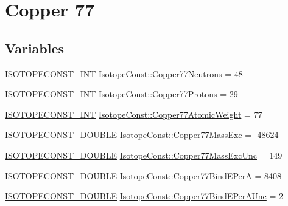 \hypertarget{group___isotope_const-_copper-_cu77}{}\section{Copper 77}
\label{group___isotope_const-_copper-_cu77}
\subsection*{Variables}
\begin{DoxyCompactItemize}
\item 
\mbox{\hyperlink{group___isotope_const-_macros_ga5f18360b3e99483a35c32d789e62621c}{I\+S\+O\+T\+O\+P\+E\+C\+O\+N\+S\+T\+\_\+\+I\+NT}} \mbox{\hyperlink{group___isotope_const-_copper-_cu77_gaa6d8b9e214c55946e8f69bb8a0518c28}{Isotope\+Const\+::\+Copper77\+Neutrons}} = 48
\item 
\mbox{\hyperlink{group___isotope_const-_macros_ga5f18360b3e99483a35c32d789e62621c}{I\+S\+O\+T\+O\+P\+E\+C\+O\+N\+S\+T\+\_\+\+I\+NT}} \mbox{\hyperlink{group___isotope_const-_copper-_cu77_gabeba4d2d1942b6d287c0b271afd48027}{Isotope\+Const\+::\+Copper77\+Protons}} = 29
\item 
\mbox{\hyperlink{group___isotope_const-_macros_ga5f18360b3e99483a35c32d789e62621c}{I\+S\+O\+T\+O\+P\+E\+C\+O\+N\+S\+T\+\_\+\+I\+NT}} \mbox{\hyperlink{group___isotope_const-_copper-_cu77_gac9554da8b690f00e4e6122b02e0f5105}{Isotope\+Const\+::\+Copper77\+Atomic\+Weight}} = 77
\item 
\mbox{\hyperlink{group___isotope_const-_macros_ga8f45a7272ce02c0b4c65c44636ed719a}{I\+S\+O\+T\+O\+P\+E\+C\+O\+N\+S\+T\+\_\+\+D\+O\+U\+B\+LE}} \mbox{\hyperlink{group___isotope_const-_copper-_cu77_ga1ed85ca1181f03ffe8fb77dee7dfca95}{Isotope\+Const\+::\+Copper77\+Mass\+Exc}} = -\/48624
\item 
\mbox{\hyperlink{group___isotope_const-_macros_ga8f45a7272ce02c0b4c65c44636ed719a}{I\+S\+O\+T\+O\+P\+E\+C\+O\+N\+S\+T\+\_\+\+D\+O\+U\+B\+LE}} \mbox{\hyperlink{group___isotope_const-_copper-_cu77_ga1d7fc596246cfa89e3ceba535ec1847d}{Isotope\+Const\+::\+Copper77\+Mass\+Exc\+Unc}} = 149
\item 
\mbox{\hyperlink{group___isotope_const-_macros_ga8f45a7272ce02c0b4c65c44636ed719a}{I\+S\+O\+T\+O\+P\+E\+C\+O\+N\+S\+T\+\_\+\+D\+O\+U\+B\+LE}} \mbox{\hyperlink{group___isotope_const-_copper-_cu77_ga52135cba5fb596a980d29b66c60c9e65}{Isotope\+Const\+::\+Copper77\+Bind\+E\+PerA}} = 8408
\item 
\mbox{\hyperlink{group___isotope_const-_macros_ga8f45a7272ce02c0b4c65c44636ed719a}{I\+S\+O\+T\+O\+P\+E\+C\+O\+N\+S\+T\+\_\+\+D\+O\+U\+B\+LE}} \mbox{\hyperlink{group___isotope_const-_copper-_cu77_ga2490aad2e2027a9c2acd1ee09624af93}{Isotope\+Const\+::\+Copper77\+Bind\+E\+Per\+A\+Unc}} = 2

\end{DoxyCompactItemize}
